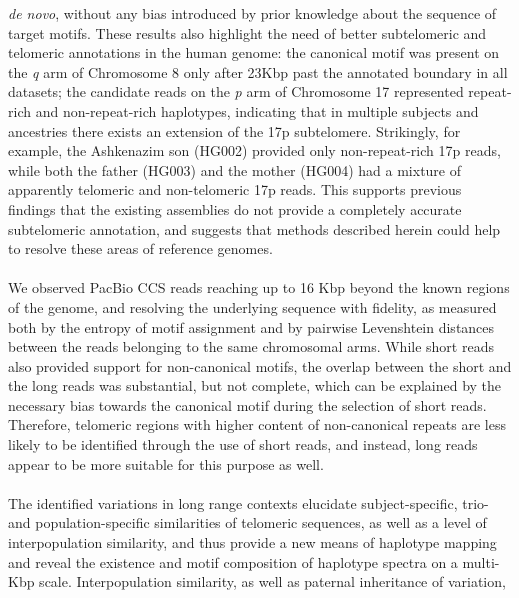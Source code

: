 \documentclass{article}
\begin{document}
            \textit{de novo}, without any bias introduced by prior knowledge about the sequence of target motifs.
    These results also highlight the need of better subtelomeric and telomeric annotations in the human genome:
        the canonical motif was present on the \textit{q} arm of Chromosome 8
            only after 2\textendash{}3Kbp past the annotated boundary in all datasets;
        the candidate reads on the \textit{p} arm of Chromosome 17 represented repeat-rich and non-repeat-rich haplotypes,
            indicating that in multiple subjects and ancestries there exists an extension of the 17p subtelomere.
            Strikingly, for example, the Ashkenazim son (HG002) provided only non-repeat-rich 17p reads, while both
            the father (HG003) and the mother (HG004) had a mixture of apparently telomeric and non-telomeric 17p reads.
    This supports previous findings \parencite{riethman2020}
            that the existing assemblies do not provide a completely accurate subtelomeric annotation,
        and suggests that methods described herein could help to resolve these areas of reference genomes.
    \\~\\
    We observed PacBio CCS reads reaching up to 16 Kbp beyond the known regions of the genome,
        and resolving the underlying sequence with fidelity,
        as measured both by the entropy of motif assignment and by pairwise Levenshtein distances
            between the reads belonging to the same chromosomal arms.
    While short reads also provided support for non-canonical motifs,
        the overlap between the short and the long reads was substantial, but not complete,
        which can be explained by the necessary bias towards the canonical motif during the selection of short reads.
    Therefore, telomeric regions with higher content of non-canonical repeats are less likely to be identified through the use of short reads,
        and instead, long reads appear to be more suitable for this purpose as well.
    \\~\\
    The identified variations in long range contexts elucidate
        subject-specific, trio- and population-specific similarities of telomeric sequences,
            as well as a level of interpopulation similarity,
        and thus provide a new means of haplotype mapping and reveal the existence and motif composition of haplotype spectra
            on a multi-Kbp scale.
    Interpopulation similarity, as well as paternal inheritance of variation,
\end{document}
